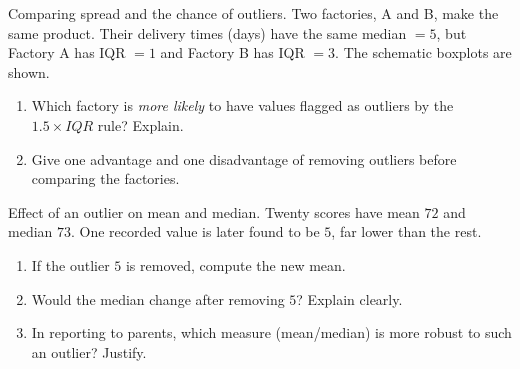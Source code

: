\documentclass[11pt]{article}
\def\textbf#1{#1}%
\def\mathrm#1{#1}%
\newcounter{question}
\begin{document}

\begin{question}
\textbf{Comparing spread and the chance of outliers.}
Two factories, A and B, make the same product. Their delivery times (days) have the same median $= 5$,  
but Factory A has IQR $=1$ and Factory B has IQR $=3$. The schematic boxplots are shown.

\begin{center}
\end{center}

\begin{enumerate}
  \item Which factory is \emph{more likely} to have values flagged as outliers by the $1.5\times\mathrm{IQR}$ rule? Explain.
  \item Give one advantage and one disadvantage of removing outliers before comparing the factories.
\end{enumerate}
\end{question}


\begin{question}
\textbf{Effect of an outlier on mean and median.}
Twenty scores have mean $72$ and median $73$. One recorded value is later found to be $5$, far lower than the rest.
\begin{enumerate}
  \item If the outlier $5$ is removed, compute the new mean.
  \item Would the median change after removing $5$? Explain clearly.
  \item In reporting to parents, which measure (mean/median) is more robust to such an outlier? Justify.
\end{enumerate}
\end{question}
\end{document}
